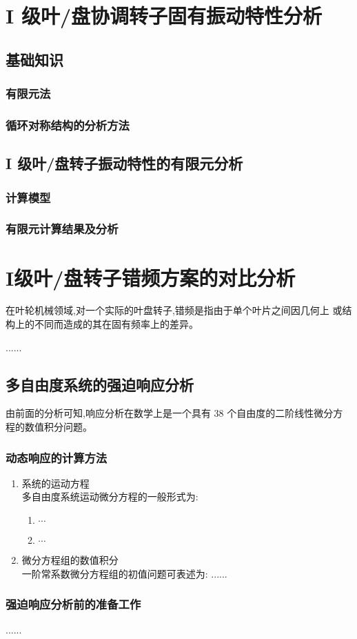 \chapter{I 级叶/盘协调转子固有振动特性分析}
\section{基础知识}
\subsection{有限元法}
\subsection{循环对称结构的分析方法}
\section{I 级叶/盘转子振动特性的有限元分析}
\subsection{计算模型}

\subsection{有限元计算结果及分析}

\chapter{I级叶/盘转子错频方案的对比分析}

在叶轮机械领域,对一个实际的叶盘转子,错频是指由于单个叶片之间因几何上
或结构上的不同而造成的其在固有频率上的差异\cite{图书馆史研究}。\par

......\par

\section{多自由度系统的强迫响应分析}

由前面的分析可知,响应分析在数学上是一个具有 38 个自由度的二阶线性微分方
程的数值积分问题\cite{中国学术期刊标准化数据库系统工程的}。\par

\subsection{动态响应的计算方法}

\begin{enumerate}
\item 系统的运动方程\\
多自由度系统运动微分方程的一般形式为:
\begin{enumerate}
\item $\cdots$
\item $\cdots$
\end{enumerate}
\item 微分方程组的数值积分\\
一阶常系数微分方程组的初值问题可表述为: ......
\end{enumerate}

\subsection{强迫响应分析前的准备工作}
......\par

